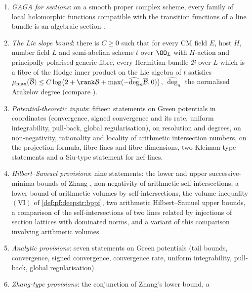 \begin{definition}
\begin{enumerate}[label=(G\arabic*)]
and in addition $\kappa\cdot\omega_{G^D}\subseteq\operatorname{im}(\alpha_G\otimes\OO)$ for every $\kappa\in\OO$ with
$v(\kappa)^{p-1}\le v(p)$ if $p$ is odd and $v(\kappa)\le v(4)$ if $p=2$ \cite{Faltings1988,FarguesGenestierLafforgue2008}.
\item\label{G:pf:deepstr:gaga} \emph{GAGA for sections}: on a smooth proper complex scheme, every family of
local holomorphic functions compatible with the transition functions of a line bundle is an algebraic
section \cite{Serre1956}.
\item\label{G:pf:deepstr:slope} \emph{The Lie slope bound}: there is $C\ge0$ such that for every CM field $E$,
host $H$, number field $L$ and semi-abelian scheme $t$ over $\OO_L$ with $H$-action and principally polarised
generic fibre, every Hermitian bundle $\overline{\mathcal B}$ over $L$ which is a fibre of the Hodge inner product
on the Lie algebra of $t$ satisfies $\mu_{\max}(\overline{\mathcal B})\le
C\log\bigl(2+\rank\mathcal B+\max(-\widehat{\deg}_n\overline{\mathcal B},0)\bigr)$, $\widehat{\deg}_n$ the normalised
Arakelov degree (compare \cite{Bost1996}).
\item\label{G:pf:deepstr:pb} \emph{Potential-theoretic inputs}: fifteen statements on Green potentials in
coordinates (convergence, signed convergence and its rate, uniform integrability, pull-back, global
regularisation), on resolution and degrees, on non-negativity, rationality and locality of arithmetic
intersection numbers, on the projection formula, fibre lines and fibre dimensions, two Kleiman-type
statements and a Siu-type statement for nef lines.
\item\label{G:pf:deepstr:provhs} \emph{Hilbert--Samuel provisions}: nine statements: the lower and upper
successive-minima bounds of Zhang \cite{Zhang1995}, non-negativity of arithmetic self-intersections, a lower
bound of arithmetic volumes by self-intersections, the volume inequality $\mathrm{(VI)}$ of
\cref{def:pf:deepstr:bppf}, two arithmetic Hilbert--Samuel upper bounds, a comparison of the
self-intersections of two lines related by injections of section lattices with dominated norms, and a
variant of this comparison involving arithmetic volumes.
\item\label{G:pf:deepstr:provan} \emph{Analytic provisions}: seven statements on Green potentials (tail bounds,
convergence, signed convergence, convergence rate, uniform integrability, pull-back, global regularisation).
\item\label{G:pf:deepstr:zhang} \emph{Zhang-type provisions}: the conjunction of Zhang's lower bound, a

\end{enumerate}
\end{definition}
